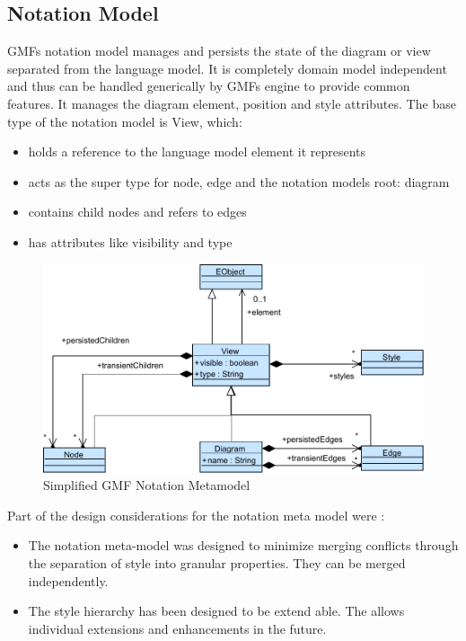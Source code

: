 \subsection{Notation Model}
GMFs notation model manages and persists the state of the diagram or view separated from the language model. It is completely domain model independent and thus can be handled generically by GMFs engine to provide common features. It manages the diagram element, position and style attributes. \cite{EMP} The base type of the notation model is View, which:
\begin{itemize}
	\item holds a reference to the language model element it represents 
	\item acts as the super type for node, edge and the notation models root: diagram
	\item contains child nodes and refers to edges
	\item has attributes like visibility and type
\end{itemize}

\begin{figure}
\centering
\includegraphics[scale=0.8]{gfx/ex/GMF_Notation} 
\caption{Simplified GMF Notation Metamodel}
\label{MM:GMF}
\end{figure}

Part of the design considerations for the notation meta model were \cite{GMFDoc}:
\begin{itemize}
	\item The notation meta-model was designed to minimize merging conflicts through the separation of style into granular properties. They can be merged independently.
	\item The style hierarchy has been designed to be extend able. The allows individual extensions and enhancements in the future. 
\end{itemize}

